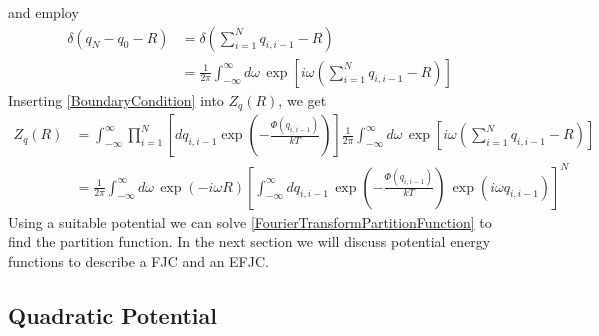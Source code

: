 %
and employ
%
\begin{align}
\delta\left(q_{N}-q_{0}-R\right) & =\delta\left(\sum_{i=1}^{N}q_{i,i-1}-R\right)\nonumber\\
&=\frac{1}{2\pi}\int_{-\infty}^{\infty}d\omega\,\exp\left[i\omega\left(\sum_{i=1}^{N}q_{i,i-1}-R\right)\right]\label{BoundaryCondition}
\end{align}
%
Inserting \eqref{BoundaryCondition} into $Z_{q}\left(R\right)$, we get
%
\begin{align}
Z_{q}\left(R\right) & =\int_{-\infty}^{\infty}\prod_{i=1}^{N}\left[dq_{i,i-1}\exp\left(-\frac{\Phi\left(q_{i,i-1}\right)}{kT}\right)\right]\frac{1}{2\pi}\int_{-\infty}^{\infty}d\omega\,\exp\left[i\omega\left(\sum_{i=1}^{N}q_{i,i-1}-R\right)\right]\nonumber\\
 & =\frac{1}{2\pi}\int_{-\infty}^{\infty}d\omega\,\exp\left(-i\omega R\right)\left[\int_{-\infty}^{\infty}dq_{i,i-1}\,\exp\left(-\frac{\Phi\left(q_{i,i-1}\right)}{kT}\right)\,\exp\left(i\omega q_{i,i-1}\right)\right]^{N}\label{FourierTransformPartitionFunction}
\end{align}
%
Using a suitable potential we can solve \eqref{FourierTransformPartitionFunction} to find the partition function. In the next section we will discuss potential energy functions to describe a FJC and an EFJC.

\subsection{Quadratic Potential}

